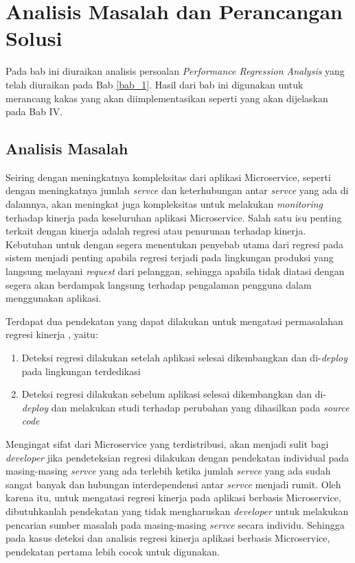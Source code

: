 \chapter{Analisis Masalah dan Perancangan Solusi}
Pada bab ini diuraikan analisis persoalan \textit{Performance Regression Analysis} yang telah diuraikan pada Bab \ref{bab_1}. Hasil dari bab ini digunakan untuk merancang kakas yang akan diimplementasikan seperti yang akan dijelaskan pada Bab IV. 


\section{Analisis Masalah}
\label{analisis-masalah}

Seiring dengan meningkatnya kompleksitas dari aplikasi Microservice, seperti dengan meningkatnya jumlah \textit{servce} dan keterhubungan antar \textit{servce} yang ada di dalamnya, akan meningkat juga kompleksitas untuk melakukan \textit{monitoring} terhadap kinerja pada keseluruhan aplikasi Microservice. Salah satu isu penting terkait dengan kinerja adalah regresi atau penurunan terhadap kinerja. Kebutuhan untuk dengan segera menentukan penyebab utama dari regresi pada sistem menjadi penting apabila regresi terjadi pada lingkungan produksi yang langsung melayani \textit{request} dari pelanggan, sehingga apabila tidak diatasi dengan segera akan berdampak langsung terhadap pengalaman pengguna dalam menggunakan aplikasi. 

Terdapat dua pendekatan yang dapat dilakukan untuk mengatasi permasalahan regresi kinerja \citep{regression-detection}, yaitu:
\begin{enumerate}
	\item Deteksi regresi dilakukan setelah aplikasi selesai dikembangkan dan di-\textit{deploy} pada lingkungan terdedikasi
	\item Deteksi regresi dilakukan sebelum aplikasi selesai dikembangkan dan di-\textit{deploy} dan melakukan studi terhadap perubahan yang dihasilkan pada \textit{source code}
\end{enumerate}  

Mengingat sifat dari Microservice yang terdistribusi, akan menjadi sulit bagi \textit{developer} jika pendeteksian regresi dilakukan dengan pendekatan individual pada masing-masing \textit{servce} yang ada terlebih ketika jumlah \textit{servce} yang ada sudah sangat banyak dan hubungan interdependensi antar \textit{servce} menjadi rumit. Oleh karena itu, untuk mengatasi regresi kinerja pada aplikasi berbasis Microservice, dibutuhkanlah pendekatan yang tidak mengharuskan \textit{developer} untuk melakukan pencarian sumber masalah pada masing-masing \textit{servce} secara individu. Sehingga pada kasus deteksi dan analisis regresi kinerja aplikasi berbasis Microservice, pendekatan pertama lebih cocok untuk digunakan.

